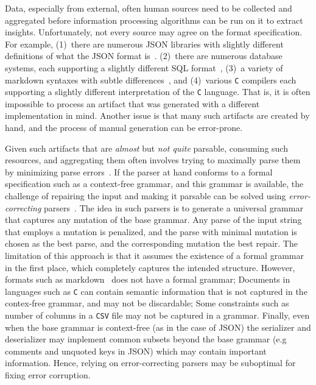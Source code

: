 \documentclass[sigconf,review,anonymous]{acmart}
\def\<#1>{\texttt{#1}}
\begin{document}
Data, especially from external, often human sources need to be collected and
aggregated before information processing algorithms can be run on it to extract
insights. Unfortunately, not every source may agree on the format specification.
For example, (1)~there are numerous JSON libraries with slightly different
definitions of what the JSON format is~\cite{harrand2021behavioral,seriot2016parsing}.
(2)~there are numerous database systems, each supporting a slightly
different SQL format~\cite{arvin2018comparison}, (3)~a variety of markdown
syntaxes with subtle differences~\cite{visnoviz2019comparison}, and (4)~various
\<C> compilers each supporting a slightly different interpretation of the \<C> language.
That is, it is often impossible to process an artifact that was generated with
a different implementation in mind. Another issue is that many such artifacts
are created by hand, and the process of manual generation can be error-prone.

Given such artifacts that are \emph{almost} but \emph{not quite} parsable,
consuming such resources, and aggregating them often involves trying to
maximally parse them by minimizing parse errors~\cite{kirschner2020debugging}.
If the parser at hand conforms to a formal specification such as a context-free
grammar, and this grammar is available,
the challenge of repairing the input and making it parsable can be solved using
\emph{error-correcting} parsers~\cite{aho1972minimum,diekmann2020dont}.
The idea in such parsers is to generate a universal grammar that captures
any mutation of the base grammar. Any parse of the input string that employs a
mutation is penalized, and the parse with minimal mutation is chosen as the
best parse, and the corresponding mutation the best repair. The limitation of
this approach is that it assumes the existence of a formal grammar in the first
place, which completely captures the intended structure.
However, formats such as markdown~\cite{gruber2004markdown} does not have
a formal grammar; Documents in languages such as \<C> can contain semantic
information that is not captured in the contex-free grammar, and may not be
discardable; Some constraints such as number of columns in a \<CSV> file may
not be captured in a grammar. Finally, even when the base grammar is context-free
(as in the case of JSON) the serializer and deserializer may implement common
subsets beyond the base grammar (e.g comments and unquoted keys in JSON) which may
contain important information. Hence, relying on error-correcting parsers may
be suboptimal for fixing error corruption.
\end{document}
